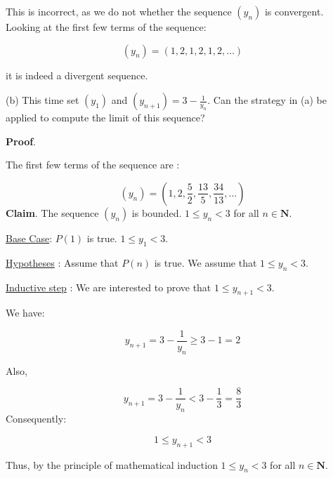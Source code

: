 \documentclass[10pt]{article}
\begin{document}
This is incorrect, as we do not whether the sequence $\displaystyle ( y_{n})$ is convergent. Looking at the first few terms of the sequence:


\begin{equation*}
( y_{n}) =( 1,2,1,2,1,2,\dotsc )
\end{equation*}


it is indeed a divergent sequence.



(b) This time set $\displaystyle ( y_{1})$ and $\displaystyle ( y_{n+1}) =3-\frac{1}{y_{n}}$. Can the strategy in (a) be applied to compute the limit of this sequence?



\textbf{Proof}.



The first few terms of the sequence are :


\begin{equation*}
( y_{n}) =\left( 1,2,\frac{5}{2} ,\frac{13}{5} ,\frac{34}{13} ,\dotsc \right)
\end{equation*}
\textbf{Claim}. The sequence $\displaystyle ( y_{n})$ is bounded. $\displaystyle 1\leq y_{n} < 3$ for all $\displaystyle n\in \mathbf{N}$.



\underline{Base Case}: $\displaystyle P( 1)$ is true. $\displaystyle 1\leq y_{1} < 3$.



\underline{Hypotheses} : Assume that $\displaystyle P( n)$ is true. We assume that $\displaystyle 1\leq y_{n} < 3$.



\underline{Inductive step} : We are interested to prove that $\displaystyle 1\leq y_{n+1} < 3$.



We have:


\begin{equation*}
y_{n+1} =3-\frac{1}{y_{n}} \geq 3-1=2
\end{equation*}


Also,


\begin{equation*}
y_{n+1} =3-\frac{1}{y_{n}} < 3-\frac{1}{3} =\frac{8}{3}
\end{equation*}
Consequently: 


\begin{equation*}
1\leq y_{n+1} < 3
\end{equation*}


Thus, by the principle of mathematical induction $\displaystyle 1\leq y_{n} < 3$ for all $\displaystyle n\in \mathbf{N}$.
\end{document}
